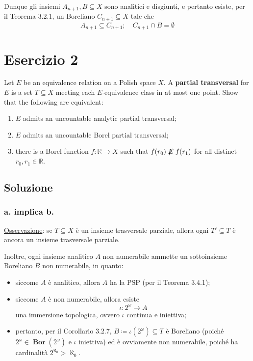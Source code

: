\documentclass{article}
\newcommand{\1}{\mathds{1}}
\newcommand{\R}{\mathds{R}}
\newcommand{\qedd}{\tag*{$\blacksquare$}} %
\renewcommand{\href}[2]{#2}
\begin{document}
\begin{enumerate}
Dunque gli insiemi \(A_{n+1}, B \subseteq X\) sono analitici e disgiunti, e pertanto esiste, per il Teorema 3.2.1, un Boreliano \(C_{n+1} \subseteq X\) tale che
\begin{equation*}
 A_{n+1} \subseteq C_{n+1}; \quad C_{n+1}\cap B =\emptyset\qedd
\end{equation*}
\end{enumerate}
\section{Esercizio 2}
\label{sec:org427ea94}

Let \(E\) be an equivalence relation on a Polish space \(X\). A \textbf{partial transversal} for \(E\) is a set \(T \subseteq X\) meeting each \(E\)-equivalence class in at most one point. Show that the following are equivalent:
\begin{enumerate}
\item \(E\) admits an uncountable analytic partial transversal;
\item \(E\) admits an uncountable Borel partial transversal;
\item there is a Borel function \(f: \R \to X\) such that \(f(r_0) \not\mathrel{E} f(r_1)\) for all distinct \(r_0, r_1 \in \R\).
\end{enumerate}
\subsection{Soluzione}
\label{sec:orgf1df743}

\subsubsection{a. implica b.}
\label{sec:org5c34a71}

\uline{Osservazione}: se \(T \subseteq X\) è un insieme trasversale parziale, allora ogni \(T' \subseteq T\) è ancora un insieme trasversale parziale.

Inoltre, \href{../../../../../../org/roam/20250522113216-ogni_insieme_analitico_non_numerabile_ammette_un_sottoinsieme_boreliano_non_numerabile.org}{ogni insieme analitico \(A\) non numerabile ammette un sottoinsieme Boreliano \(B\) non numerabile}, in quanto:
\begin{itemize}
\item siccome \(A\) è analitico, allora \(A\) ha la PSP (per il Teorema 3.4.1);
\item siccome \(A\) è non numerabile, allora esiste
\begin{equation*}
  \iota: 2^{\omega}\to A
\end{equation*}
una immersione topologica, ovvero \(\iota\) continua e iniettiva;
\item pertanto, per il Corollario 3.2.7, \(B\coloneqq\iota(2^{\omega}) \subseteq T\) è Boreliano (poiché \(2^{\omega} \in \bm{{\operatorname{Bor}}}(2^{\omega})\) e \(\iota\) iniettiva) ed è ovviamente non numerabile, poiché ha cardinalità \(2^{\aleph_{0}}>\aleph_{0}\).
\end{itemize}
\end{document}
